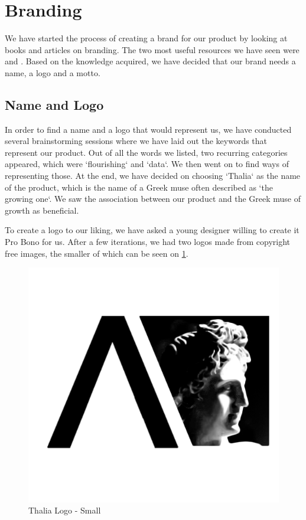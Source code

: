 \documentclass[main.tex]{subfiles}
\begin{document}
\section{Branding}
\label{Branding}
We have started the process of creating a brand for our product by looking at books and articles on branding. The two most useful resources we have seen were \cite{basics_branding} and \cite{clifton_2009}. Based on the knowledge acquired, we have decided that our brand needs a name, a logo and a motto.

\subsection{Name and Logo}
In order to find a name and a logo that would represent us, we have conducted several brainstorming sessions where we have laid out the keywords that represent our product. Out of all the words we listed, two recurring categories appeared, which were `flourishing` and `data`. We then went on to find ways of representing those. At the end, we have decided on choosing `Thalia` as the name of the product, which is the name of a Greek muse often described as `the growing one`. We saw the association between our product and the Greek muse of growth as beneficial.

To create a logo to our liking, we have asked a young designer willing to create it Pro Bono for us. After a few iterations, we had two logos made from copyright free images, the smaller of which can be seen on \figurename{\ref{small_logo}}.

\begin{figure}[H]
    \centering
    \includegraphics[scale=0.4]{00Branding/00Pictures/small_logo.png}
    \caption{Thalia Logo - Small}
    \label{small_logo}
\end{figure}
\end{document}

